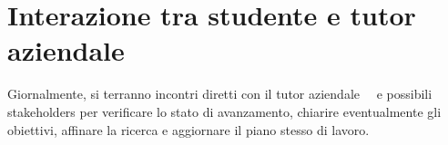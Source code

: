 \section*{Interazione tra studente e tutor aziendale}

Giornalmente, si terranno incontri diretti con il tutor aziendale 
\nomeTutorAziendale\ \cognomeTutorAziendale\ e possibili stakeholders 
per verificare lo stato di avanzamento, chiarire eventualmente gli obiettivi, 
affinare la ricerca e aggiornare il piano stesso di lavoro.